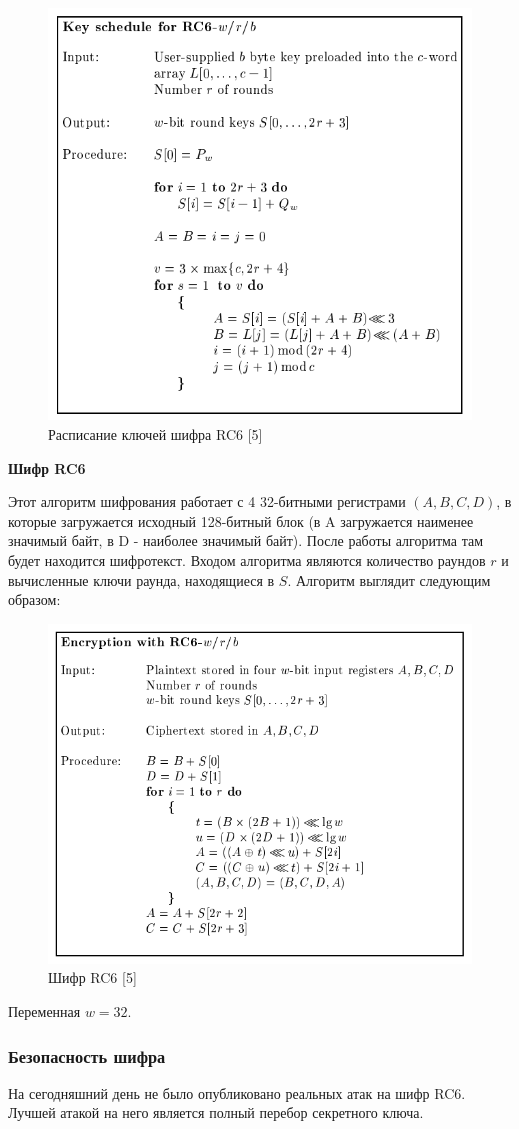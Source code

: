 \documentclass[colorthm]{./civarticle}
\begin{document}
\begin{figure}[H]
    \centering
    \includegraphics[width=0.5\linewidth]{rc_keys.png}
    \caption{Расписание ключей шифра RC6 [5]}
    \label{fig:enter-label}
\end{figure}

\textbf{Шифр RC6}

Этот алгоритм шифрования работает с 4 32-битными регистрами $(A, B, C, D)$, в которые загружается исходный 128-битный блок (в A загружается наименее значимый байт, в D - наиболее значимый байт). После работы алгоритма там будет находится шифротекст. Входом алгоритма являются количество раундов $r$ и вычисленные ключи раунда, находящиеся в $S$. Алгоритм выглядит следующим образом: 

\begin{figure}
    \centering
    \includegraphics[width=0.5\linewidth]{rc6.png}
    \caption{Шифр RC6 [5]}
    \label{fig:enter-label}
\end{figure}

Переменная $w = 32$.

\subsubsection{Безопасность шифра}
На сегодняшний день не было опубликовано реальных атак на шифр RC6. Лучшей атакой на него является полный перебор секретного ключа.
\end{document}
